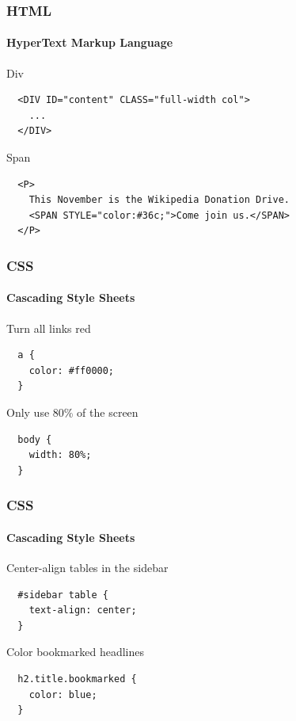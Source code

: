 \documentclass[dvipsnames]{beamer}
\begin{document}
\begin{frame}[fragile=singleslide]
  \frametitle{HTML}
  \framesubtitle{HyperText Markup Language}

  \begin{block}{Div}
    \begin{Verbatim}
  <DIV ID="content" CLASS="full-width col">
    ...
  </DIV>
    \end{Verbatim}
  \end{block}

  \begin{block}{Span}
    \begin{Verbatim}
  <P>
    This November is the Wikipedia Donation Drive.
    <SPAN STYLE="color:#36c;">Come join us.</SPAN>
  </P>
    \end{Verbatim}
  \end{block}
\end{frame}


\begin{frame}[fragile=singleslide]
  \frametitle{CSS}
  \framesubtitle{Cascading Style Sheets}
 
  \begin{block}{Turn all links red}
    \begin{Verbatim}
  a {
    color: #ff0000;
  }
    \end{Verbatim}
  \end{block} 

  \begin{block}{Only use 80\% of the screen}
    \begin{Verbatim}
  body {
    width: 80%;
  }
    \end{Verbatim}
  \end{block}
\end{frame}


\begin{frame}[fragile=singleslide]
  \frametitle{CSS}
  \framesubtitle{Cascading Style Sheets}
 
  \begin{block}{Center-align tables in the sidebar}
    \begin{Verbatim}
  #sidebar table {
    text-align: center;
  }
    \end{Verbatim}
  \end{block} 

  \begin{block}{Color bookmarked headlines}
    \begin{Verbatim}
  h2.title.bookmarked {
    color: blue;
  }
    \end{Verbatim}
  \end{block}
\end{frame}
\end{document}
